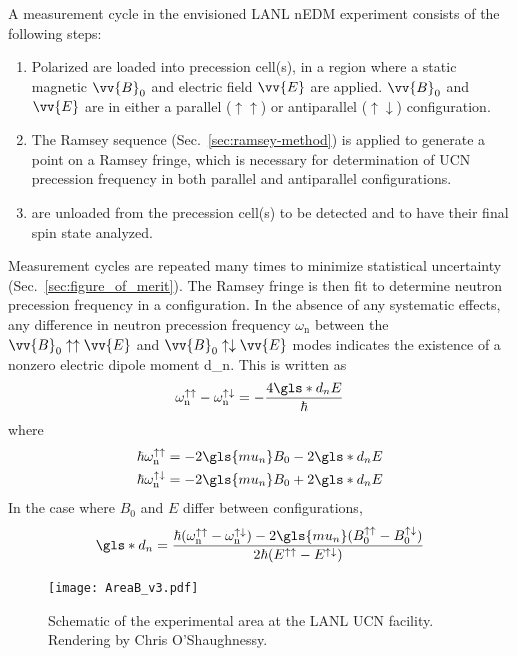 
A measurement cycle in the envisioned LANL nEDM experiment consists of the following steps: 
%
\begin{enumerate}
    \item Polarized \ucn are loaded into precession cell(s), in a region where a static magnetic $\vv{B}_0$ and electric field $\vv{E}$ are applied. $\vv{B}_0$ and $\vv{E}$ are in either a parallel ($\uparrow\uparrow$) or antiparallel ($\uparrow\downarrow$) configuration.
    \item The Ramsey sequence (Sec.~\ref{sec:ramsey-method}) is applied to generate a point on a Ramsey fringe, which is necessary for determination of UCN precession frequency in both parallel and antiparallel configurations.
    \item \ucn are unloaded from the precession cell(s) to be detected and to have their final spin state analyzed.
\end{enumerate}
%
Measurement cycles are repeated many times to minimize statistical uncertainty (Sec.~\ref{sec:figure_of_merit}). The Ramsey fringe is then fit to determine neutron precession frequency in a configuration. In the absence of any systematic effects, any difference in neutron precession frequency $\omega_\text{n}$ between the $\vv{B}_0\uparrow\uparrow\vv{E}$ and $\vv{B}_0\uparrow\downarrow\vv{E}$ modes indicates the existence of a nonzero electric dipole moment \gls*{d_n}. This is written as
%
\begin{gather}
    \omega_\text{n}^{\uparrow\uparrow} - \omega_\text{n}^{\uparrow\downarrow} = -\frac{4\gls*{d_n}E}{\hbar}\label{eq:delta_omega_dipole_relation}
\end{gather}
%
where
%
\begin{align}
    \hbar \omega_\text{n}^{\uparrow\uparrow} &= -2\gls{mu_n}B_0 - 2\gls*{d_n}E\\
    \hbar \omega_\text{n}^{\uparrow\downarrow} &= -2\gls{mu_n}B_0 + 2\gls*{d_n}E
\end{align}
%
In the case where $B_0$ and $E$ differ between configurations,
%
\begin{gather}
    \gls*{d_n}=\frac{\hbar(\omega_\text{n}^{\uparrow\uparrow} - \omega_\text{n}^{\uparrow\downarrow})-2\gls{mu_n}(B_0^{\uparrow\uparrow} - B_0^{\uparrow\downarrow})}{2\hbar(E^{\uparrow\uparrow} - E^{\uparrow\downarrow})}
\end{gather}
%
\begin{figure}
    \centering
    \texttt{[image: AreaB\_v3.pdf]}
    \caption[Schematic of the experimental area at the LANL UCN facility.]
    {Schematic of the experimental area at the LANL UCN facility. Rendering by Chris O'Shaughnessy.}
    \label{fig:AreaB_schematic}
\end{figure}

